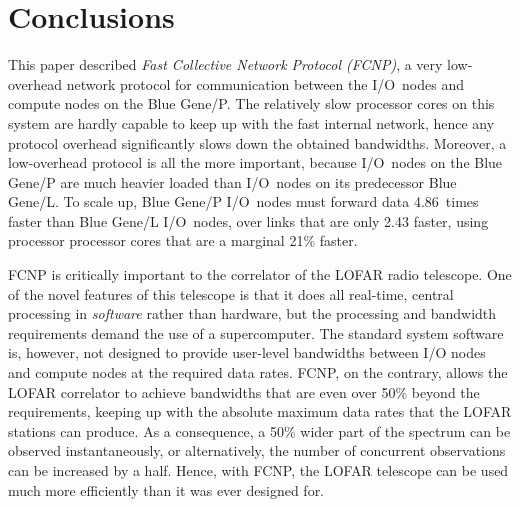 \documentclass[journal]{IEEEtran}
\begin{document}
\section{Conclusions}
\label{sec:conclusions}

This paper described \emph{Fast Collective Network Protocol (FCNP)}, a very
low-overhead network protocol for communication between the I/O~nodes and
compute nodes on the Blue Gene/P.
The relatively slow processor cores on this system are hardly capable to
keep up with the fast internal network, hence any protocol overhead
significantly slows down the obtained bandwidths.
Moreover, a low-overhead protocol is all the more important, because I/O~nodes
on the Blue Gene/P are much heavier loaded than I/O~nodes on its predecessor
Blue Gene/L.
To scale up, Blue Gene/P I/O~nodes must forward data 4.86~times faster than
Blue Gene/L I/O~nodes, over links that are only 2.43 faster, using processor
processor cores that are a marginal 21\% faster.

FCNP is critically important to the correlator of the LOFAR radio telescope.
One of the novel features of this telescope is that it does all real-time,
central processing in \emph{software\/} rather than hardware, but the
processing and bandwidth requirements demand the use of a supercomputer.
The standard system software is, however, not designed to provide user-level
bandwidths between I/O nodes and compute nodes at the required data rates.
FCNP, on the contrary, allows the LOFAR correlator to achieve bandwidths
that are even over 50\% beyond the requirements, keeping up with the
absolute maximum data rates that the LOFAR stations can produce.
As a consequence, a 50\% wider part of the spectrum can be observed
instantaneously, or alternatively, the number of concurrent observations
can be increased by a half.
Hence, with FCNP, the LOFAR telescope can be used much more efficiently than
it was ever designed for.





\end{document}
